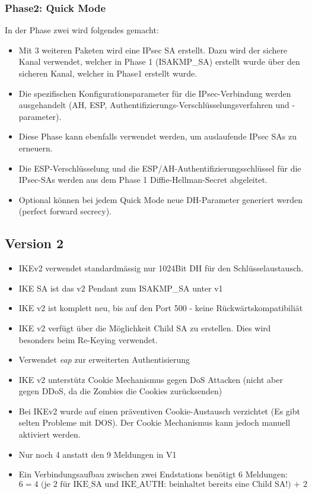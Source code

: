 \subsubsection{Phase2: Quick Mode}
In der Phase zwei wird folgendes gemacht:
\begin{itemize}
    \item Mit 3 weiteren Paketen wird eine IPsec SA erstellt. Dazu wird der sichere Kanal verwendet, welcher in Phase 1 (ISAKMP\_SA) erstellt wurde über den sicheren Kanal, welcher in Phase1 erstellt wurde.
    \item Die spezifischen Konfigurationsparameter für die IPsec-Verbindung werden ausgehandelt (AH, ESP, Authentifizierungs-Verschlüsselungsverfahren und -parameter).
    \item Diese Phase kann ebenfalls verwendet werden, um auslaufende IPsec SAs zu erneuern.
    \item Die ESP-Verschlüsselung und die ESP/AH-Authentifizierungsschlüssel für die IPsec-SAs werden aus dem Phase 1 Diffie-Hellman-Secret abgeleitet.
    \item Optional können bei jedem Quick Mode neue DH-Parameter generiert werden (perfect forward secrecy). 
\end{itemize}

\subsection{Version 2}
\begin{itemize}
	\item IKEv2 verwendet standardmässig nur 1024Bit DH für den Schlüsselaustausch. 
	\item IKE SA ist das v2 Pendant zum ISAKMP\_SA unter v1
	\item IKE v2 ist komplett neu, bis auf den Port 500 - keine Rückwärtskompatibiliät
	\item IKE v2 verfügt über die Möglichkeit Child SA zu erstellen. Dies wird besonders beim Re-Keying verwendet.
	\item Verwendet \textit{eap} zur erweiterten Authentisierung
	\item IKE v2 unterstütz Cookie Mechanismus gegen DoS Attacken (nicht aber gegen DDoS, da die Zombies die Cookies zurücksenden)
	\item Bei IKEv2 wurde auf einen präventiven Cookie-Austausch verzichtet (Es gibt selten Probleme mit DOS). Der Cookie Mechanismus kann jedoch manuell aktiviert werden. 
	\item Nur noch 4 anstatt den 9 Meldungen in V1
	\item Ein Verbindungsaufbau zwischen zwei Endstations benötigt 6 Meldungen:
	\[
	6 = \text{4 (je 2 für IKE\_SA und IKE\_AUTH: beinhaltet bereits eine Child SA!) + 2 (Child SA)}
	\]
\end{itemize}


